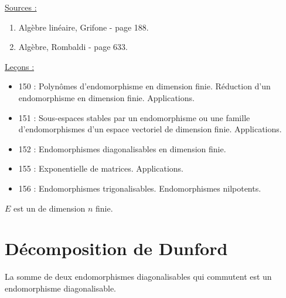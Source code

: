 

\pagestyle{fancy}

\fancyhead[R]{}



\underline{Sources :} 
\begin{enumerate}[label=(\roman*)]
\item Algèbre linéaire, Grifone - page 188. 
\item Algèbre, Rombaldi - page 633.
\end{enumerate}

\underline{Leçons :}
\begin{itemize}
\item 150 : Polynômes d’endomorphisme en dimension finie. Réduction d’un endomorphisme en dimension finie. Applications.
\item 151 : Sous-espaces stables par un endomorphisme ou une famille d’endomorphismes d’un espace vectoriel de dimension finie.
Applications.
\item 152 : Endomorphismes diagonalisables en dimension finie.
\item 155 : Exponentielle de matrices. Applications.
\item 156 : Endomorphismes trigonalisables. Endomorphismes nilpotents.

\end{itemize}

\begin{nota}
$E$ est un \Kev de dimension $n$ finie.
\end{nota}

\section{Décomposition de Dunford}

\begin{lem}
\label{lem:diagsimu}
La somme de deux endomorphismes diagonalisables qui commutent est un endomorphisme diagonalisable.
\end{lem}

